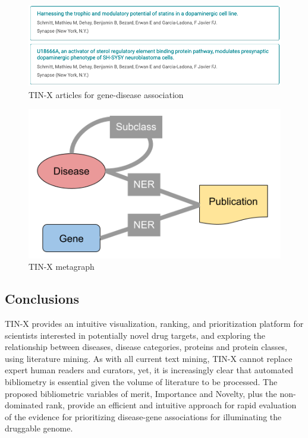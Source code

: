 \begin{figure}
    \centering
    \includegraphics[width=\linewidth]{figures/tinx/TINX_SYNRG3articles_rev2.png}
    \caption{TIN-X articles for gene-disease association}
    \label{fig:tinx_02}
\end{figure}

\begin{figure}
    \includegraphics[width=\linewidth]{figures/tinx/TIN-X_metagraph.png}
    \caption{TIN-X metagraph}
    \label{fig:tinx_metagraph}
\end{figure}

\subsection{Conclusions}

TIN-X provides an intuitive visualization, ranking, and prioritization platform for scientists interested in potentially novel drug targets, and exploring the relationship between diseases, disease categories, proteins and protein classes, using literature mining.  As with all current text mining, TIN-X cannot replace expert human readers and curators, yet, it is increasingly clear that automated bibliometry is essential given the volume of literature to be processed. The proposed bibliometric variables of merit, Importance and Novelty, plus the non-dominated rank, provide an efficient and intuitive approach for rapid evaluation of the evidence for prioritizing disease-gene associations for illuminating the druggable genome. 

